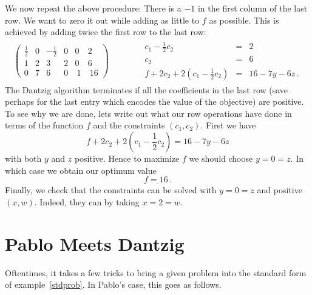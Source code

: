 \begin{example}
We now repeat the above procedure: There is a $-1$ in the first column of the last row. We want to zero it out while adding as little to
$f$ as possible. This is achieved by adding twice the first row to the last row:
\[
\begin{array}{c|c}
\left(
\begin{array}{rrrrr|r}
\frac12&0&-\frac12&0&0&2\\[1mm]
1&2&3&2&0&6\\\hline
0&7&6&0&\ 1&\ 16
\end{array}\right)
\quad\quad  &\quad 
\begin{array}{rcl}
c_1-\frac12 c_2&=&2\\[1mm]
c_2&=&6\\
f+2c_2+2(c_1-\frac12 c_2)&=&16-7y-6z\, .
\end{array}
\end{array}
\]
The Dantzig algorithm terminates if all the coefficients in the last row (save perhaps for the last entry which encodes the value of the objective) are positive.
To see why we are done, lets write out what our row operations have done in terms of the function $f$ and the constraints $(c_1,c_2)$.
First we have
\[
f+2c_2+2(c_1-\frac12 c_2)=16-7y-6z
\]
with both $y$ and $z$ positive. Hence to maximize $f$ we should choose $y=0=z$. In which case we obtain our optimum value
\[
\underline{f=16\, .}
\]
Finally, we check that the constraints can be solved with $y=0=z$ and positive $(x,w)$. Indeed, they can by taking $x=2=w$.
\end{example} 

\section{Pablo Meets Dantzig} 
Oftentimes, it takes a few tricks to bring a given problem into the standard  form of example~\ref{stdprob}. In Pablo's case, this goes as follows.

